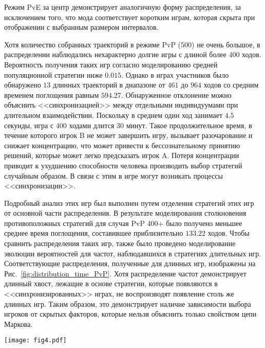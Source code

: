 Режим PvE за центр демонстрирует аналогичную форму распределения, за исключением того, что мода соответствует коротким играм, которая скрыта при отображении с выбранным размером интервалов.

Хотя количество собранных траекторий в режиме PvP ($500$) не очень большое, в распределении наблюдались нехарактерно долгие игры с длиной более $400$ ходов. Вероятность получения таких игр согласно моделированию средней популяционной стратегии ниже $0.015$. Однако в играх участников было обнаружено $13$ длинных траекторий в диапазоне от $461$ до $964$ ходов со средним временем поглощения равным $594.27$. Обнаруженное отклонение можно объяснить <<синхронизацией>> между отдельными индивидуумами при длительном взаимодействии. Поскольку в среднем один ход занимает $4.5$ секунды, игра с $400$ ходами длится $30$ минут. Такое продолжительное время, в течение которого игрок B не может завершить игру, вызывает разочарование и снижает концентрацию, что может привести к бессознательному принятию решений, которые может легко предсказать игрок A. Потеря концентрации приводит к ухудшению способности человека производить выбор стратегий случайным образом. В связи с этим в игре могут возникать процессы <<синхронизации>>.

Подробный анализ этих игр был выполнен путем отделения стратегий этих игр от основной части распределения. В результате моделирования столкновения противоположных стратегий для случая PvP 400+ было получено меньшее среднее время поглощения, составившее приблизительно $133.22$ ходов. Чтобы сравнить распределения таких игр, также было проведено моделирование эволюции вероятностей для частот, наблюдавшихся в стратегиях длительных игр. Соответствующие распределения, полученные для длинных игр, изображены на Рис.~\cref{fig:distribution_time_PvP}. Хотя распределение частот демонстрирует длинный хвост, лежащие в основе стратегии, которые появляются в <<синхронизированных>> играх, не воспроизводят появление столь же длинных игр. Таким образом, это демонстрирует наличие зависимости выбора игроков от скрытых факторов, которые нельзя объяснить только свойством цепи Маркова.

\begin{figure*}[t]
    \centering
    \texttt{[image: fig4.pdf]}
    \caption{
        Распределение времени поглощения для режима PvP (желтая гистограмма и фиолетовая линия) по сравнению с моделированием частот направлений движения (зеленая линия) и частот стратегий (синяя линия), наблюдаемых в длительных играх (более $400$ ходов). Частоты направлений движения для каждого состояния, полученные в экспериментальных длинных играх, использовались для моделирования эволюции вероятностей найти фишку в узлах решетки. Стратегии обоих игроков A и B в PvP с длиной ходов более $400$ использовались отдельно при моделировании.
    }  
    \label{fig:distribution_time_PvP}

\end{figure*}

